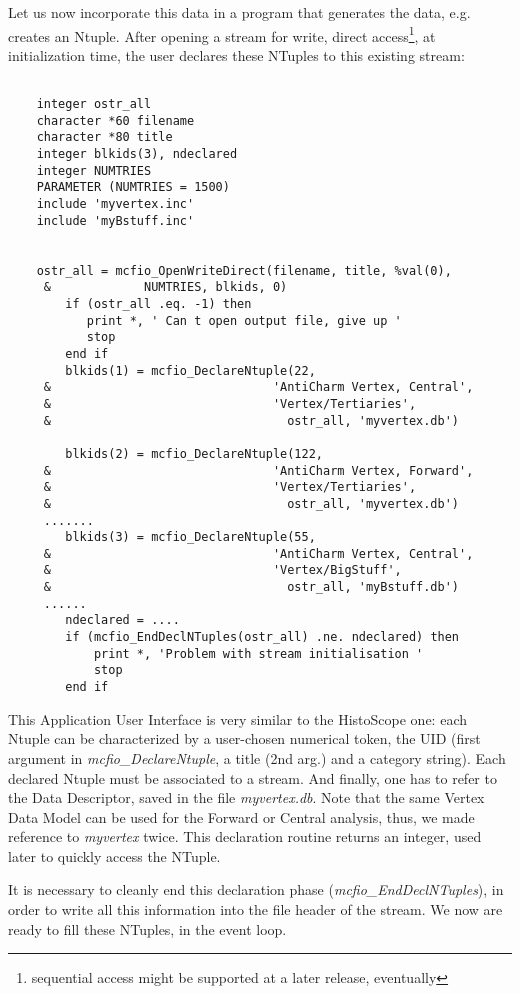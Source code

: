 	Let us now incorporate this data in a program that generates the data,
e.g. creates an Ntuple.  After opening a stream for write, direct
access\footnote{sequential access might be supported at a later release,
eventually}, at initialization time,  the user declares these NTuples to this 
existing stream: 
\begin{verbatim}

	integer ostr_all
	character *60 filename
	character *80 title
	integer blkids(3), ndeclared
	integer NUMTRIES
	PARAMETER (NUMTRIES = 1500)
	include 'myvertex.inc'
	include 'myBstuff.inc'

	
	ostr_all = mcfio_OpenWriteDirect(filename, title, %val(0), 
     &             NUMTRIES, blkids, 0)
        if (ostr_all .eq. -1) then 
           print *, ' Can t open output file, give up '
           stop
        end if
        blkids(1) = mcfio_DeclareNtuple(22,
     &                               'AntiCharm Vertex, Central',
     &                               'Vertex/Tertiaries',
     &                                 ostr_all, 'myvertex.db') 
     
        blkids(2) = mcfio_DeclareNtuple(122,
     &                               'AntiCharm Vertex, Forward',
     &                               'Vertex/Tertiaries',
     &                                 ostr_all, 'myvertex.db')
     .......
        blkids(3) = mcfio_DeclareNtuple(55,
     &                               'AntiCharm Vertex, Central',
     &                               'Vertex/BigStuff',
     &                                 ostr_all, 'myBstuff.db') 
     ......
        ndeclared = ....
        if (mcfio_EndDeclNTuples(ostr_all) .ne. ndeclared) then 
            print *, 'Problem with stream initialisation '
            stop
        end if

\end{verbatim}

This Application User Interface is very similar to the HistoScope  one: each
Ntuple can be characterized by a user-chosen numerical token, the  UID (first
argument in {\em mcfio\_DeclareNtuple}, a title (2nd arg.) and a  category
string).  Each declared Ntuple must be associated to a stream.  And finally, one
has to refer to the Data Descriptor, saved in the file  {\em myvertex.db}.  Note
that the same Vertex Data Model can be used for the Forward or Central
analysis, thus, we made reference to {\em myvertex} twice. This declaration 
routine returns an integer, used later to quickly access the NTuple.

	It is necessary to cleanly end this declaration phase 
({\em mcfio\_EndDeclNTuples}), in order to write all this information into 
the file header of the stream. We now are ready to fill these NTuples, in 
the event loop. 

